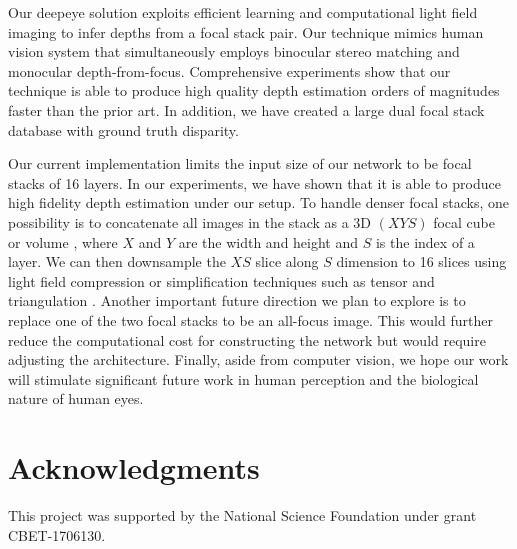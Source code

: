 \documentclass[10pt,twocolumn,letterpaper]{article}
\begin{document}
Our deepeye solution exploits efficient learning and computational light field imaging to infer depths from a focal stack pair. Our technique mimics human vision system that simultaneously employs binocular stereo matching and monocular depth-from-focus. Comprehensive experiments show that our technique is able to produce high quality depth estimation orders of magnitudes faster than the prior art. In addition, we have created a large dual focal stack database with ground truth disparity.

Our current implementation limits the input size of our network to be focal stacks of 16 layers. In our experiments, we have shown that it is able to produce high fidelity depth estimation under our setup. To handle denser focal stacks, one possibility is to concatenate all images in the stack as a 3D $(XYS)$ focal cube or volume \cite{zhou12}, where $X$ and $Y$ are  the width and height and $S$ is the index of a layer. We can then downsample the $XS$ slice along $S$ dimension to 16 slices using light field compression or simplification techniques such as tensor \cite{wanner12} and triangulation \cite{yu13}. Another important future direction we plan to explore is to replace one of the two focal stacks to be an all-focus image. This would further reduce the computational cost for constructing the network but would require adjusting the architecture. Finally, aside from computer vision, we hope our work will stimulate significant future work in human perception and the biological nature of human eyes.

\section{Acknowledgments}

This project was supported by the National Science Foundation under grant CBET-1706130.





{\small


}
\end{document}
